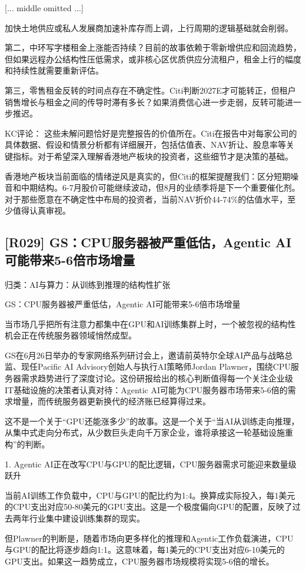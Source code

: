 \documentclass[11pt]{ctexart}
\begin{document}
[... middle omitted ...]

加快土地供应或私人发展商加速补库存而上调，上行周期的逻辑基础就会削弱。

第二，中环写字楼租金上涨能否持续？目前的故事依赖于零新增供应和回流趋势，但如果远程办公结构性压低需求，或非核心区优质供应分流租户，租金上行的幅度和持续性就需要重新评估。

第三，零售租金反转的时间点存在不确定性。Citi判断2027E才可能转正，但租户销售增长与租金之间的传导时滞有多长？如果消费信心进一步走弱，反转可能进一步推迟。

KC评论： 这些未解问题恰好是完整报告的价值所在。Citi在报告中对每家公司的具体数据、假设和情景分析都有详细展开，包括估值表、NAV折让、股息率等关键指标。对于希望深入理解香港地产板块的投资者，这些细节才是决策的基础。

香港地产板块当前面临的情绪逆风是真实的，但Citi的框架提醒我们：区分短期噪音和中期结构。6-7月股价可能继续波动，但8月的业绩季将是下一个重要催化剂。对于那些愿意在不确定性中布局的投资者，当前NAV折价44-74\%的估值水平，至少值得认真审视。

\subsection{[R029] GS：CPU服务器被严重低估，Agentic AI可能带来5-6倍市场增量}
{\small\color{refgray}归类：AI与算力：从训练到推理的结构性扩张}

GS：CPU服务器被严重低估，Agentic AI可能带来5-6倍市场增量

当市场几乎把所有注意力都集中在GPU和AI训练集群上时，一个被忽视的结构性机会正在传统服务器领域悄然成型。

GS在6月26日举办的专家网络系列研讨会上，邀请前英特尔全球AI产品与战略总监、现任Pacific AI Advisory创始人与执行AI策略师Jordan Plawner，围绕CPU服务器需求趋势进行了深度讨论。这份研报给出的核心判断值得每一个关注企业级IT基础设施的决策者认真对待：Agentic AI可能为CPU服务器市场带来5-6倍的需求增量，而传统服务器更新换代的经济账已经算得过来。

这不是一个关于“GPU还能涨多少”的故事。这是一个关于“当AI从训练走向推理，从集中式走向分布式，从少数巨头走向千万家企业，谁将承接这一轮基础设施重构”的判断。

1. Agentic AI正在改写CPU与GPU的配比逻辑，CPU服务器需求可能迎来数量级跃升

当前AI训练工作负载中，CPU与GPU的配比约为1:4。换算成实际投入，每1美元的CPU支出对应50-80美元的GPU支出。这是一个极度偏向GPU的配置，反映了过去两年行业集中建设训练集群的现实。

但Plawner的判断是，随着市场向更多样化的推理和Agentic工作负载演进，CPU与GPU的配比将逐步趋向1:1。这意味着，每1美元的CPU支出对应6-10美元的GPU支出。如果这一趋势成立，CPU服务器市场规模将实现5-6倍的增长。
\end{document}
